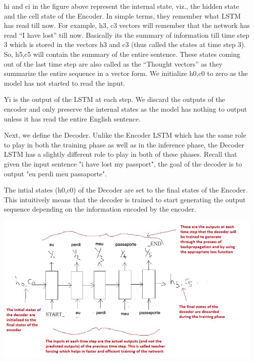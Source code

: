 \documentclass[runningheads]{llncs}
\begin{document}
 	h{i} and c{i} in the figure above represent the internal state, viz., the hidden state and the cell state of the Encoder. In simple terms, they remember what LSTM has read till now. 
 	For example, 
 	h{3}, c{3} vectors will remember that the network has read “I have lost” till now. Basically its the summary of information till time step 3 which is stored in the vectors h3 and c3 (thus called the states at time step 3). So, h{5},c{5} will contain the summary of the entire sentence. These states coming out of the last time step are also called as the “Thought vectors” as they summarize the entire sequence in a vector form. We initialize h{0},c{0} to zero as the model has not started to read the input.
 	
 	Y{i} is the output of the LSTM at each step. We discard the outputs of the encoder and only preserve the internal states as the model has nothing to output unless it has read the entire English sentence.
	
	Next, we define the Decoder. Unlike the Encoder LSTM which has the same role to play in both the training phase as well as in the inference phase, the Decoder LSTM has a slightly different role to play in both of these phases. Recall that given the input sentence "i have lost my passport", the goal of the decoder is to output "eu perdi meu passaporte". 

	The intial states (h{0},c{0}) of the Decoder are set to the final states of the Encoder. This intuitively means that the decoder is trained to start generating the output sequence depending on the information encoded by the encoder.
	
	\begin{minipage}{\linewidth}
	 	\begin{center}
	 		\includegraphics[width=\linewidth]{decoder.jpeg}
	 		\label{fig:Decoder LSTM}~\cite{ref_url6}
	 	\end{center}
	 \end{minipage}
	 \afterpage{\clearpage}
	 
\end{document}
